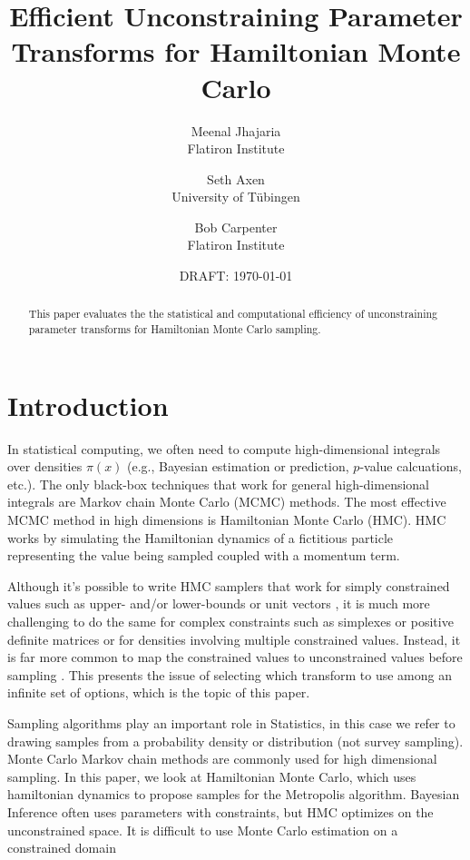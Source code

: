 \documentclass[11pt]{article}
\begin{document}
\title{Efficient Unconstraining
  Parameter Transforms for Hamiltonian Monte Carlo}
\author{Meenal Jhajaria \\ \small Flatiron Institute \and Seth Axen \\
  \small University of T\"ubingen \and Bob
  Carpenter \\ \small Flatiron Institute}
\date{DRAFT: \today}
\maketitle


\begin{abstract}
  \noindent
  This paper evaluates the the statistical and computational
  efficiency of unconstraining parameter transforms for Hamiltonian
  Monte Carlo sampling.
\end{abstract}

\section{Introduction}

In statistical computing, we often need to compute high-dimensional
integrals over densities $\pi(x)$ (e.g., Bayesian estimation or
prediction, $p$-value calcuations, etc.).  The only black-box
techniques that work for general high-dimensional integrals are
Markov chain Monte Carlo (MCMC) methods.  The most effective MCMC
method in high dimensions is Hamiltonian Monte Carlo (HMC).  HMC works
by simulating the Hamiltonian dynamics of a fictitious particle
representing the value being sampled coupled with a momentum term.

Although it's possible to write HMC samplers that work for simply
constrained values such as upper- and/or lower-bounds
\cite{neal2011mcmc} or unit vectors \cite{byrne2013geodesic}, it is
much more challenging to do the same for complex constraints such as
simplexes or positive definite matrices or for densities involving
multiple constrained values.  Instead, it is far more common to map
the constrained values to unconstrained values before sampling
\cite{}.  This presents the issue of selecting which transform to use
among an infinite set of options, which is the topic of this paper.

Sampling algorithms play an important role in Statistics, in this case
we refer to drawing samples from a probability density or distribution
(not survey sampling). Monte Carlo Markov chain methods are commonly
used for high dimensional sampling. In this paper, we look at
Hamiltonian Monte Carlo, which uses hamiltonian dynamics to propose
samples for the Metropolis algorithm. Bayesian Inference often uses
parameters with constraints, but HMC optimizes on the unconstrained
space. It is difficult to use Monte Carlo estimation on a constrained
domain ~\cite{neal2008optimal}
\end{document}
